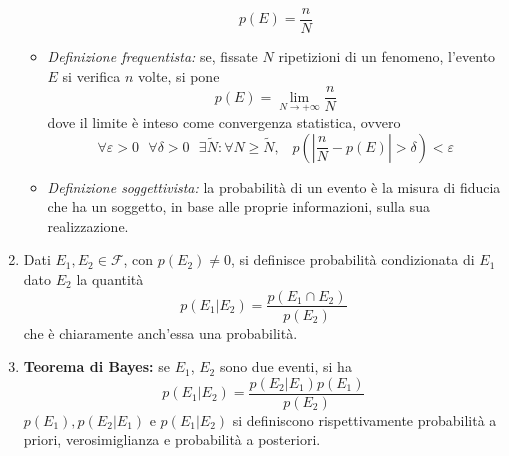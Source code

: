 \documentclass[a4paper,11pt]{article}
\begin{document}
\begin{enumerate}[resume]
\begin{itemize}
		\[p(E)=\frac{n}{N}\]
		\item \textit{Definizione frequentista:} se, fissate $N$ ripetizioni di un fenomeno, l'evento $E$ si verifica $n$ volte, si pone
		\[p(E)=\lim\limits_{N\to+\infty}\frac{n}{N}\]
		dove il limite è inteso come convergenza statistica, ovvero
		\[\forall\varepsilon>0\textrm{ }\forall\delta>0\textrm{ }\exists\tilde{N}:\forall N\ge\tilde{N}\textrm{, }\textrm{ }p\left(\left|\frac{n}{N}-p(E)\right|>\delta\right)<\varepsilon\]
		\item \textit{Definizione soggettivista:} la probabilità di un evento è la misura di fiducia che ha un soggetto, in base alle proprie informazioni, sulla sua realizzazione.
	\end{itemize}
	\item Dati $E_1,E_2\in\mathcal{F}$, con $p(E_2)\neq 0$, si definisce probabilità condizionata di $E_1$ dato $E_2$ la quantità
	\[p(E_1|E_2)=\frac{p(E_1\cap E_2)}{p(E_2)}\]
	che è chiaramente anch'essa una probabilità.
	\item\textbf{Teorema di Bayes:} se $E_1$, $E_2$ sono due eventi, si ha
	\[p(E_1|E_2)=\frac{p(E_2|E_1)p(E_1)}{p(E_2)}\]
	$p(E_1),p(E_2|E_1)$ e $p(E_1|E_2)$ si definiscono rispettivamente probabilità a priori, verosimiglianza e probabilità a posteriori.
	

\end{enumerate}
\end{document}
